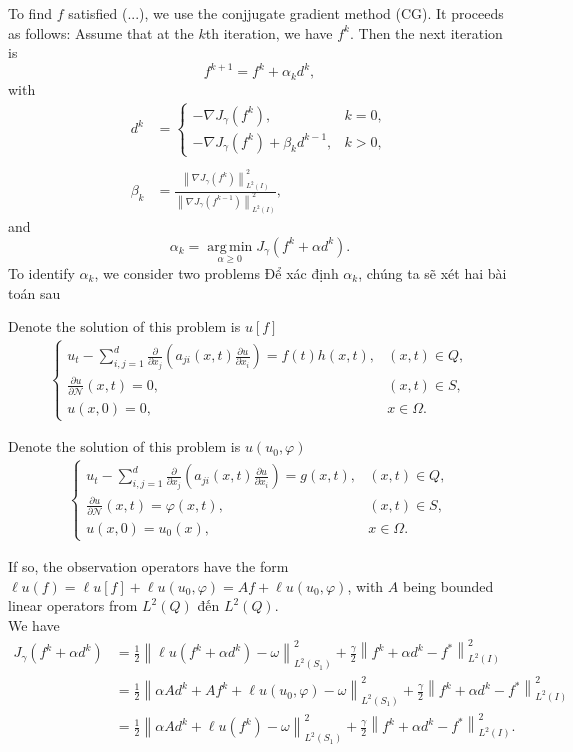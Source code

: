\documentclass[]{article}
\begin{document}
To find $f$ satisfied (...), we use the conjjugate gradient method (CG). It proceeds as follows: Assume that at the $k$th iteration, we have $f^k$. Then the next iteration is
$$f^{k+1}=f^k+\alpha_kd^k,$$
with
\begin{align*}
	d^k&=\left\{\begin{array}{ll}
	-\nabla J_\gamma(f^k),& k=0,\\
	-\nabla J_\gamma(f^k)+\beta_kd^{k-1},& k>0,
	\end{array}\right.\\\\
	\beta_k&=\frac{\left\|\nabla J_\gamma (f^k)\right\|^2_{L^2(I)}}{\left\|\nabla J_\gamma (f^{k-1})\right\|^2_{L^2(I)}},
\end{align*}
and
$$\alpha_k=\operatorname*{arg\,min}_{\alpha\geq 0}J_\gamma(f^k+\alpha d^k).$$
To identify $\alpha_k$, we consider two problems
Để xác định $\alpha_k$, chúng ta sẽ xét hai bài toán sau
\begin{bt}\label{bt3.1}
	Denote the solution of this problem is $u[f]$
	\begin{align*}
	\begin{cases}
	u_t-\sum_{i, j=1}^{d}\frac{\partial}{\partial x_j}\left(a_{ji}(x, t)\frac{\partial u}{\partial x_i}\right)=f(t)h(x, t),&(x, t)\in Q,\\
	\frac{\partial u}{\partial \mathcal{N}}(x, t)=0, & (x, t)\in S,\\
	u(x, 0)=0,&x\in \Omega.
	\end{cases}
	\end{align*}
\end{bt}
\begin{bt}\label{bt3.2}
	Denote the solution of this problem is $u(u_0, \varphi)$
	\begin{align*}
	\begin{cases}
	u_t-\sum_{i, j=1}^{d}\frac{\partial}{\partial x_j}\left(a_{ji}(x, t)\frac{\partial u}{\partial x_i}\right)=g(x, t),&(x, t)\in Q,\\
	\frac{\partial u}{\partial \mathcal{N}}(x, t)=\varphi(x, t), & (x, t)\in S,\\
	u(x, 0)=u_0(x),&x\in \Omega.
	\end{cases}
	\end{align*}
\end{bt}
If so, the observation operators have the form $\ell u(f)=\ell u[f]+\ell u(u_0, \varphi)=Af+\ell u(u_0, \varphi)$, with $A$ being bounded linear operators from $L^2(Q)$ đến $L^2(Q)$.\\
We have
\begin{align*}
	J_{\gamma}(f^k+\alpha d^k)&=\frac{1}{2}\left\|\ell u(f^k+\alpha d^k)-\omega\right\|_{L^2(S_1)}^2+\frac{\gamma}{2}\left\|f^k+\alpha d^k-f^*\right\|_{L^2(I)}^2\\[0.2cm]
	&=\frac{1}{2}\left\|\alpha Ad^k+Af^k+\ell u(u_0, \varphi)-\omega\right\|_{L^2(S_1)}^2+\frac{\gamma}{2}\left\|f^k+\alpha d^k-f^*\right\|_{L^2(I)}^2\\[0.2cm]
	&=\frac{1}{2}\left\|\alpha Ad^k+\ell u(f^k)-\omega\right\|_{L^2(S_1)}^2+\frac{\gamma}{2}\left\|f^k+\alpha d^k-f^*\right\|_{L^2(I)}^2.
\end{align*}
\end{document}
